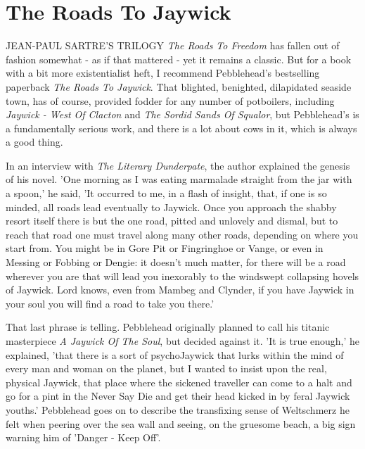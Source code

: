 \chapter{The Roads To Jaywick}

JEAN-PAUL SARTRE'S TRILOGY \emph{The Roads To Freedom} has fallen out of fashion somewhat - as if that mattered - yet it remains a classic. But for a book with a bit more existentialist heft, I recommend Pebblehead's bestselling paperback \emph{The Roads To Jaywick}. That blighted, benighted, dilapidated seaside town, has of course, provided fodder for any number of potboilers, including \emph{Jaywick - West Of Clacton} and \emph{The Sordid Sands Of Squalor}, but Pebblehead's is a fundamentally serious work, and there is a lot about cows in it, which is always a good thing.

In an interview with \emph{The Literary Dunderpate}, the author explained the genesis of his novel. 'One morning as I was eating marmalade straight from the jar with a spoon,' he said, 'It occurred to me, in a flash of insight, that, if one is so minded, all roads lead eventually to Jaywick. Once you approach the shabby resort itself there is but the one road, pitted and unlovely and dismal, but to reach that road one must travel along many other roads, depending on where you start from. You might be in Gore Pit or Fingringhoe or Vange, or even in Messing or Fobbing or Dengie: it doesn't much matter, for there will be a road wherever you are that will lead you inexorably to the windswept collapsing hovels of Jaywick. Lord knows, even from Mambeg and Clynder, if you have Jaywick in your soul you will find a road to take you there.'

That last phrase is telling. Pebblehead originally planned to call his titanic masterpiece \emph{A Jaywick Of The Soul}, but decided against it. 'It is true enough,' he explained, 'that there is a sort of psychoJaywick that lurks within the mind of every man and woman on the planet, but I wanted to insist upon the real, physical Jaywick, that place where the sickened traveller can come to a halt and go for a pint in the Never Say Die and get their head kicked in by feral Jaywick youths.' Pebblehead goes on to describe the transfixing sense of Weltschmerz he felt when peering over the sea wall and seeing, on the gruesome beach, a big sign warning him of 'Danger - Keep Off'.

